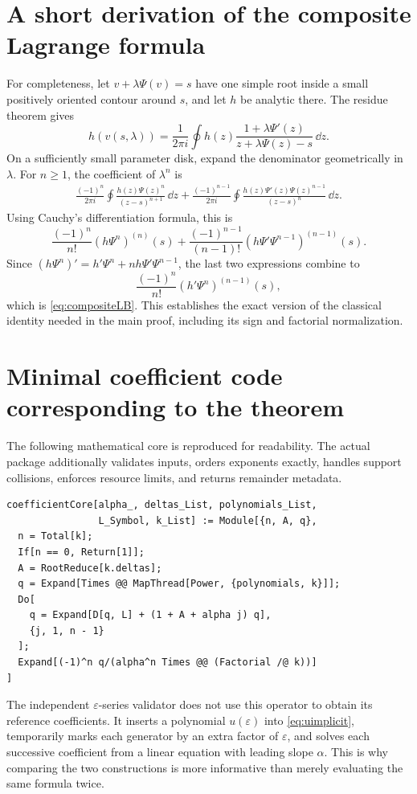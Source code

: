 \documentclass[11pt,a4paper]{article}
\numberwithin{equation}{section}
\theoremstyle{definition}\newtheorem{definition}[theorem]{Definition}
\theoremstyle{remark}\newtheorem{remark}[theorem]{Remark}
\begin{document}
\section{A short derivation of the composite Lagrange formula}
\label{app:lagrange}
For completeness, let $v+\lambda\Psi(v)=s$ have one simple root inside a small positively oriented contour around $s$, and let $h$ be analytic there. The residue theorem gives
\[
h(v(s,\lambda))=
\frac1{2\pi i}\oint h(z)\frac{1+\lambda\Psi'(z)}{z+\lambda\Psi(z)-s}\,\dd z.
\]
On a sufficiently small parameter disk, expand the denominator geometrically in $\lambda$. For $n\ge1$, the coefficient of $\lambda^n$ is
\begin{align*}
\frac{(-1)^n}{2\pi i}\oint\frac{h(z)\Psi(z)^n}{(z-s)^{n+1}}\,\dd z
+\frac{(-1)^{n-1}}{2\pi i}\oint
\frac{h(z)\Psi'(z)\Psi(z)^{n-1}}{(z-s)^n}\,\dd z.
\end{align*}
Using Cauchy's differentiation formula, this is
\[
\frac{(-1)^n}{n!}(h\Psi^n)^{(n)}(s)
+\frac{(-1)^{n-1}}{(n-1)!}(h\Psi'\Psi^{n-1})^{(n-1)}(s).
\]
Since $(h\Psi^n)'=h'\Psi^n+n h\Psi'\Psi^{n-1}$, the last two expressions combine to
\[
\frac{(-1)^n}{n!}(h'\Psi^n)^{(n-1)}(s),
\]
which is \eqref{eq:compositeLB}. This establishes the exact version of the classical identity needed in the main proof, including its sign and factorial normalization.

\section{Minimal coefficient code corresponding to the theorem}
The following mathematical core is reproduced for readability. The actual package additionally validates inputs, orders exponents exactly, handles support collisions, enforces resource limits, and returns remainder metadata.
\begin{lstlisting}
coefficientCore[alpha_, deltas_List, polynomials_List,
                L_Symbol, k_List] := Module[{n, A, q},
  n = Total[k];
  If[n == 0, Return[1]];
  A = RootReduce[k.deltas];
  q = Expand[Times @@ MapThread[Power, {polynomials, k}]];
  Do[
    q = Expand[D[q, L] + (1 + A + alpha j) q],
    {j, 1, n - 1}
  ];
  Expand[(-1)^n q/(alpha^n Times @@ (Factorial /@ k))]
]
\end{lstlisting}
The independent $\varepsilon$-series validator does not use this operator to obtain its reference coefficients. It inserts a polynomial $u(\varepsilon)$ into \eqref{eq:uimplicit}, temporarily marks each generator by an extra factor of $\varepsilon$, and solves each successive coefficient from a linear equation with leading slope $\alpha$. This is why comparing the two constructions is more informative than merely evaluating the same formula twice.
\end{document}
